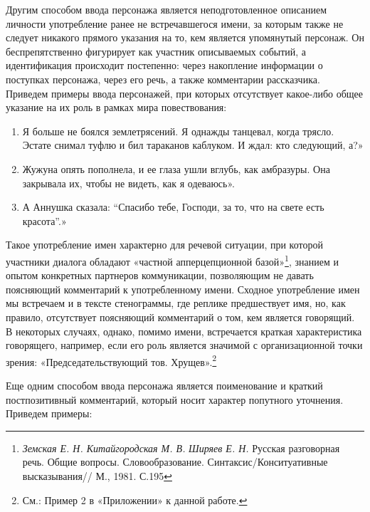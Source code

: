 \documentclass{kursa4}
\begin{document}
{{        Другим способом ввода персонажа является неподготовленное
        описанием личности употребление ранее не встречавшегося имени, за
        которым также не следует никакого прямого указания на то, кем является
        упомянутый персонаж. Он беспрепятственно фигурирует как участник
        описываемых событий, а идентификация происходит постепенно: через
        накопление информации о поступках персонажа, через его речь, а также
        комментарии рассказчика. Приведем примеры ввода персонажей, при которых
        отсутствует какое-либо общее указание на их роль в рамках мира
        повествования: 

        \begin{enumerate}
          \item Я больше не боялся землетрясений. Я однажды танцевал, когда
          трясло. Эстате снимал туфлю и бил тараканов каблуком. И ждал: кто
          следующий, а?»
          \item Жужуна опять пополнела, и ее глаза ушли вглубь, как амбразуры.
          Она закрывала их, чтобы не видеть, как я одеваюсь». 
          \item А Аннушка сказала: “Спасибо тебе, Господи, за то, что на свете
          есть красота”.»
        \end{enumerate}

        Такое употребление имен характерно для речевой ситуации, при которой
        участники диалога обладают «частной апперцепционной
        базой»\footnote{\textit{Земская Е. Н. Китайгородская М. В.
        }\textit{Ширяев Е. Н. }Русская разговорная речь. Общие вопросы.
        Словообразование. Синтаксис/Конситуативные высказывания// М., 1981.
        С.195}, знанием и опытом конкретных партнеров коммуникации,
        позволяющим не давать поясняющий комментарий к употребленному имени.
        Сходное употребление имен мы встречаем и в тексте стенограммы, где
        реплике предшествует имя, но, как правило, отсутствует поясняющий
        комментарий о том, кем является говорящий. В некоторых случаях, однако,
        помимо имени, встречается краткая характеристика говорящего, например,
        если его роль является значимой с организационной точки зрения:
        «Председательствующий тов. Хрущев».\footnote{См.: Пример 2 в
        «Приложении» к данной работе.} 

        Еще одним способом ввода персонажа является поименование и краткий
        постпозитивный комментарий, который носит характер попутного уточнения.
        Приведем примеры:

}}
\end{document}
